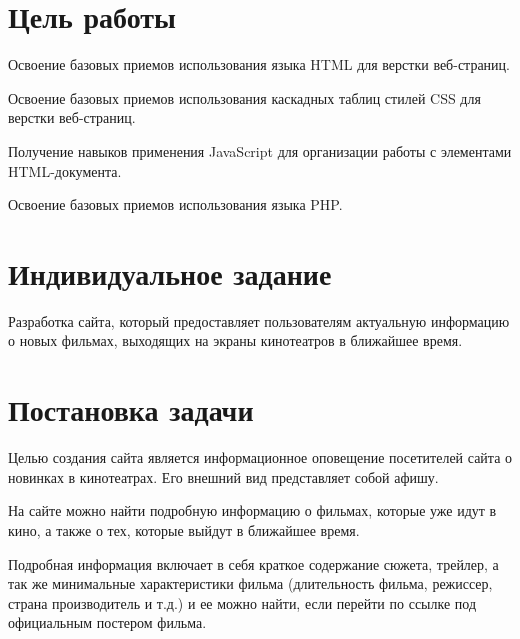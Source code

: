 \section{Цель работы}
Освоение базовых приемов использования языка HTML для верстки веб-страниц. 

Освоение базовых приемов использования каскадных таблиц стилей CSS для верстки веб-страниц.

Получение навыков применения  JavaScript  для организации работы с 
элементами HTML-документа.

Освоение базовых приемов использования языка PHP. 

\section{Индивидуальное  задание}
Разработка сайта, который предоставляет пользователям актуальную информацию о новых фильмах, выходящих на экраны кинотеатров в ближайшее время.

\section{Постановка задачи}
Целью создания сайта является информационное оповещение посетителей сайта о новинках в кинотеатрах. Его внешний вид представляет собой афишу.

На сайте можно найти подробную информацию о фильмах, которые уже идут в кино, а также о тех, которые выйдут в ближайшее время.

Подробная информация включает в себя краткое содержание сюжета, трейлер, а так же минимальные характеристики фильма (длительность фильма, режиссер, страна производитель и т.д.) и ее можно найти, если перейти по ссылке под официальным постером фильма.
